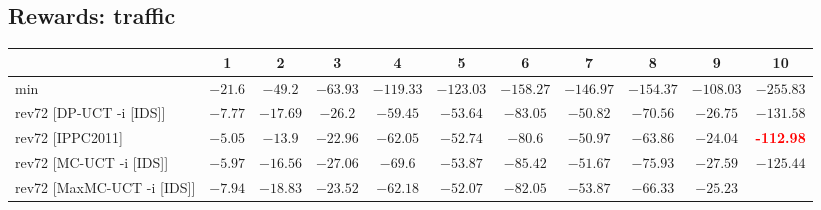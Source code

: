 \documentclass{article}
\begin{document}
\bigskip

\subsection*{Rewards: traffic}

\begin{tabular}{|l|r@{$\pm$}rr@{$\pm$}rr@{$\pm$}rr@{$\pm$}rr@{$\pm$}rr@{$\pm$}rr@{$\pm$}rr@{$\pm$}rr@{$\pm$}rr@{$\pm$}r|}
\hline

& \multicolumn{2}{c}{1}
& \multicolumn{2}{c}{2}
& \multicolumn{2}{c}{3}
& \multicolumn{2}{c}{4}
& \multicolumn{2}{c}{5}
& \multicolumn{2}{c}{6}
& \multicolumn{2}{c}{7}
& \multicolumn{2}{c}{8}
& \multicolumn{2}{c}{9}
& \multicolumn{2}{c|}{10}
\\
\hline
\hline
min
& \multicolumn{2}{c}{$-21.6$}
& \multicolumn{2}{c}{$-49.2$}
& \multicolumn{2}{c}{$-63.93$}
& \multicolumn{2}{c}{$-119.33$}
& \multicolumn{2}{c}{$-123.03$}
& \multicolumn{2}{c}{$-158.27$}
& \multicolumn{2}{c}{$-146.97$}
& \multicolumn{2}{c}{$-154.37$}
& \multicolumn{2}{c}{$-108.03$}
& \multicolumn{2}{c|}{$-255.83$}
\\
rev72 [DP-UCT -i [IDS]]
& \multicolumn{2}{c}{$-7.77$}
& \multicolumn{2}{c}{$-17.69$}
& \multicolumn{2}{c}{$-26.2$}
& \multicolumn{2}{c}{$-59.45$}
& \multicolumn{2}{c}{$-53.64$}
& \multicolumn{2}{c}{$-83.05$}
& \multicolumn{2}{c}{$-50.82$}
& \multicolumn{2}{c}{$-70.56$}
& \multicolumn{2}{c}{$-26.75$}
& \multicolumn{2}{c|}{$-131.58$}
\\
rev72 [IPPC2011]
& \multicolumn{2}{c}{$-5.05$}
& \multicolumn{2}{c}{$-13.9$}
& \multicolumn{2}{c}{$-22.96$}
& \multicolumn{2}{c}{$-62.05$}
& \multicolumn{2}{c}{$-52.74$}
& \multicolumn{2}{c}{$-80.6$}
& \multicolumn{2}{c}{$-50.97$}
& \multicolumn{2}{c}{$-63.86$}
& \multicolumn{2}{c}{$-24.04$}
& \multicolumn{2}{c|}{\textbf{\textcolor{red}{-112.98}}}
\\
rev72 [MC-UCT -i [IDS]]
& \multicolumn{2}{c}{$-5.97$}
& \multicolumn{2}{c}{$-16.56$}
& \multicolumn{2}{c}{$-27.06$}
& \multicolumn{2}{c}{$-69.6$}
& \multicolumn{2}{c}{$-53.87$}
& \multicolumn{2}{c}{$-85.42$}
& \multicolumn{2}{c}{$-51.67$}
& \multicolumn{2}{c}{$-75.93$}
& \multicolumn{2}{c}{$-27.59$}
& \multicolumn{2}{c|}{$-125.44$}
\\
rev72 [MaxMC-UCT -i [IDS]]
& \multicolumn{2}{c}{$-7.94$}
& \multicolumn{2}{c}{$-18.83$}
& \multicolumn{2}{c}{$-23.52$}
& \multicolumn{2}{c}{$-62.18$}
& \multicolumn{2}{c}{$-52.07$}
& \multicolumn{2}{c}{$-82.05$}
& \multicolumn{2}{c}{$-53.87$}
& \multicolumn{2}{c}{$-66.33$}
& \multicolumn{2}{c}{$-25.23$}

\end{tabular}
\end{document}
